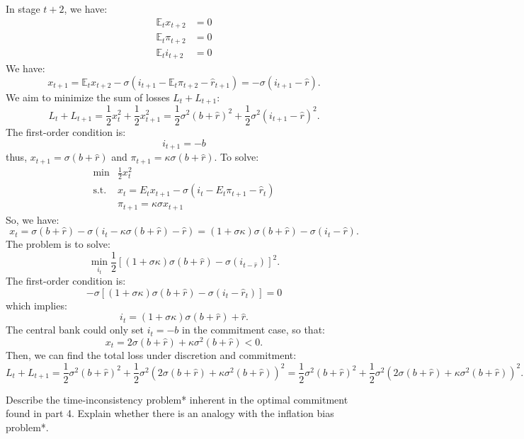 \begin{solution}
    In stage $t+2$, we have:
    \begin{align*}
        \mathbb{E}_t x_{t+2} &=0 \\
        \mathbb{E}_t \pi_{t+2} &=0 \\
        \mathbb{E}_t i_{t+2} &=0
    \end{align*}
    We have:
    \[
    x_{t+1} = \mathbb{E}_t x_{t+2} - \sigma(i_{t+1} - \mathbb{E}_t \pi_{t+2} - \hat{r}_{t+1}) = -\sigma(i_{t+1} - \hat{r}).
    \]
    We aim to minimize the sum of losses $L_t + L_{t+1}$:
    \[
    L_t + L_{t+1} = \frac{1}{2} x_t^2 + \frac{1}{2} x_{t+1}^2 = \frac{1}{2} \sigma^2 (b+\hat{r})^2 + \frac{1}{2} \sigma^2 (i_{t+1} - \hat{r})^2.
    \]
    The first-order condition is:
    \[
    i_{t+1} = -b
    \]
    thus, $x_{t+1} = \sigma (b+\hat{r})$ and $\pi_{t+1} = \kappa \sigma(b + \hat{r}). $
    To solve:
    \begin{align*}
        \min & \frac{1}{2}x_t^2 \\
        \text{s.t.} & x_t = E_t x_{t+1} - \sigma(i_t - E_t \pi_{t+1} - \hat{r}_t) \\
        & \pi_{t+1} = \kappa \sigma x_{t+1}
    \end{align*}
    So, we have:
    \[
    x_t = \sigma (b+\hat{r}) - \sigma(i_t - \kappa \sigma (b+\hat{r}) - \hat{r}) = (1+\sigma \kappa) \sigma (b+\hat{r}) - \sigma (i_{t}-\hat{r}).
    \]
    The problem is to solve:
    \[ 
    \min_{i_t} \frac{1}{2} \left[(1+\sigma \kappa) \sigma (b+\hat{r}) - \sigma (i_{t-\hat{r}})\right]^2.
    \]
    The first-order condition is:
    \[
    -\sigma \left[(1+\sigma \kappa)\sigma (b+\hat{r}) - \sigma (i_t - \hat{r}_t)\right] = 0
    \]
    which implies:
    \[
    i_t = (1+\sigma \kappa)\sigma (b+\hat{r}) + \hat{r}.
    \]
    The central bank could only set $i_t = -b$ in the commitment case, so that:
    \[ 
    x_t = 2\sigma (b+\hat{r}) + \kappa\sigma^2(b+\hat{r})<0.
    \]
    Then, we can find the total loss under discretion and commitment:
    \[
    L_t + L_{t+1} = \frac{1}{2} \sigma^2 (b+\hat{r})^2 + \frac{1}{2} \sigma^2 (2\sigma (b+\hat{r}) + \kappa\sigma^2(b+\hat{r}))^2 = \frac{1}{2} \sigma^2 (b+\hat{r})^2 + \frac{1}{2} \sigma^2 (2\sigma (b+\hat{r}) + \kappa\sigma^2(b+\hat{r}))^2.
    \]
    
\end{solution}

\begin{problem*}[5]
Describe the time-inconsistency problem* inherent in the optimal commitment found in part 4.
Explain whether there is an analogy with the inflation bias problem*.
\end{problem*}

